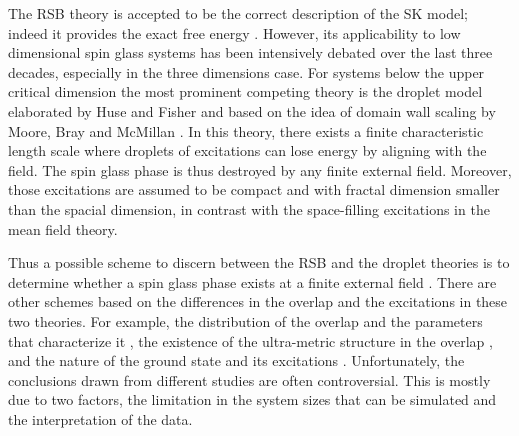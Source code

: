 \documentclass[aps,prb,twocolumn,showpacs,superscriptaddress]{revtex4}
\begin{document}
The RSB theory is accepted to be the correct description of the SK model; indeed 
it provides the exact free energy \cite{Talagrand-2006,Guerra-2003}. 
However, its applicability to low dimensional spin glass systems has been intensively debated 
over the last three decades, especially in the three dimensions case. For systems 
below the upper critical dimension \cite{Harris-Lubensky-Chen-1976,Tasaki-1989,Green-Moore-Bray-1983} 
the most prominent competing theory is the droplet model elaborated by 
Huse and Fisher \cite{Fisher-Huse-1988,Fisher-Huse-1987} and based on the idea of 
domain wall scaling by Moore, Bray and McMillan \cite{McMillan-1984,Bray-Moore-1987}. 
In this theory, there exists a finite characteristic length scale where droplets of 
excitations can lose energy by aligning with the field. The spin glass phase is thus 
destroyed by any finite external field. Moreover, those excitations are assumed to 
be compact and with fractal dimension smaller than the spacial dimension, in contrast 
with the space-filling excitations in the mean field theory. 

Thus a possible scheme to discern between the RSB and the droplet theories is to determine
whether a spin glass phase exists at a finite external field \cite{Young-Katzgraber2004}. 
There are other schemes based on the differences in the overlap and the excitations in these two theories. 
For example, the distribution of the overlap and the parameters that characterize it \cite{Hatano-Gubernatis-2002, 
Marinari-etal-1998,Marinari-etal-1999,Bokil-etal-1999,Moore-etal-1998,Monthus-Garel-2013}, 
the existence of the ultra-metric structure in the overlap \cite{Hed-Young-Domany-2004,Contucci-etal-2007}, 
and the nature of the ground state and its 
excitations \cite{Palassini-Young-2000a,Palassini-Young-2000b,Aspelmeier-Moore-Young-2003,Marinari-Parisi-2001,
Houdayer-Martin-1999,Marinari-Parisi-Zuliani-2000,Marinari-etal-1999}.
Unfortunately, the conclusions drawn from different studies are often controversial.  
This is mostly due to two factors, the limitation in the system sizes that can be 
simulated and the interpretation of the data. 
\end{document}
